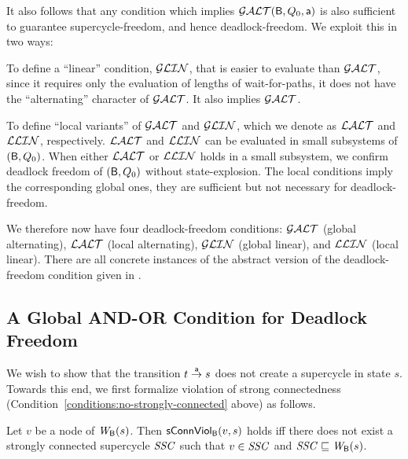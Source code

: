 It also follows that any condition which implies $\GAO(\B, Q_0, \act)$ is also sufficient to guarantee  supercycle-freedom, and
hence deadlock-freedom. We exploit this in two ways:
\bn

\item To define a ``linear'' condition, $\GLin$, that is easier to evaluate than $\GAO$, since it requires only the
evaluation of lengths of wait-for-paths, \ie it does not have the ``alternating'' character of $\GAO$.  It also implies $\GAO$.

\item To define ``local variants'' of $\GAO$ and $\GLin$, which we denote as $\LAO$ and $\LLin$, respectively.  $\LAO$ and $\LLin$ can be evaluated in
  small subsystems of $(\B, Q_0)$. When either $\LAO$ or $\LLin$ holds in a small subsystem, we confirm deadlock freedom of $(\B, Q_0)$ without
  state-explosion. The local conditions imply the corresponding global ones, \ie they are sufficient but not necessary for deadlock-freedom.

\en
%
We therefore now have four deadlock-freedom conditions: $\GAO$ (global alternating), $\LAO$ (local alternating), $\GLin$ (global linear), and $\LLin$
(local linear). There are all concrete instances of the abstract version of the deadlock-freedom condition given in .





   \subsection{A Global AND-OR Condition for Deadlock Freedom}
   \label{s:global.ANDOR}
%   

%

We wish to show that the transition $t \goesto[\act] s$
does not create a supercycle in state $s$.
Towards this end, we first formalize violation of strong connectedness
(Condition~\ref{conditions:no-strongly-connected} above) as follows.

\begin{definition}
\label{def:sConn.violation}
 Let $v$ be a node of $\wfg{\B}{s}$.   Then $\connViol{v}{s}$ holds iff there does not exist a 
strongly connected supercycle $\SSC$ such that $v \in \SSC$ and $\SSC \subg \wfg{\B}{s}$.
\end{definition}



